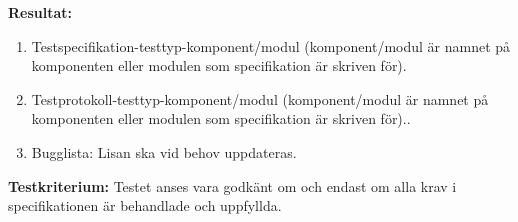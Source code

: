 \documentclass[a4paper,10pt]{article}
\begin{document}
\textbf{Resultat:}
    \begin{enumerate}
        \item \label{itm:Testspecifikation-a} Testspecifikation-testtyp-komponent/modul (komponent/modul är namnet på komponenten eller modulen som specifikation är skriven för).
        \item \label{itm:Testprotokoll-a} Testprotokoll-testtyp-komponent/modul (komponent/modul är namnet på komponenten eller modulen som specifikation är skriven för)..
        \item Bugglista: Lisan ska vid behov uppdateras.
    \end{enumerate}

\textbf{Testkriterium:} Testet anses vara godkänt om och endast om alla krav i specifikationen är behandlade och uppfyllda.
\clearpage
\printbibliography
\end{document}
